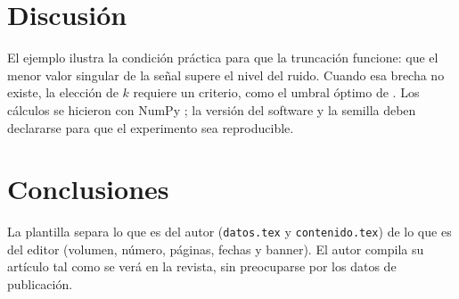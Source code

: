 \section{Discusión}
\label{sec:discusion}

El ejemplo ilustra la condición práctica para que la truncación funcione: que el menor valor singular de la señal supere el nivel del ruido. Cuando esa brecha no existe, la elección de $k$ requiere un criterio, como el umbral óptimo de \citet{gavish2014optimal}. Los cálculos se hicieron con NumPy \citep{harris2020array}; la versión del software y la semilla deben declararse para que el experimento sea reproducible.

\section{Conclusiones}
\label{sec:conclusiones}

La plantilla separa lo que es del autor (\texttt{datos.tex} y \texttt{contenido.tex}) de lo que es del editor (volumen, número, páginas, fechas y banner). El autor compila su artículo tal como se verá en la revista, sin preocuparse por los datos de publicación.

